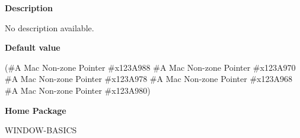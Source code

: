  
{\bf Description}

No description available.

 
{\bf Default value}

(\#\<A Mac Non-zone Pointer \#x123A988\> \#\<A Mac Non-zone Pointer \#x123A970\> \#\<A Mac Non-zone Pointer \#x123A978\> \#\<A Mac Non-zone Pointer \#x123A968\> \#\<A Mac Non-zone Pointer \#x123A980\>)

 
{\bf Home Package}

WINDOW-BASICS

